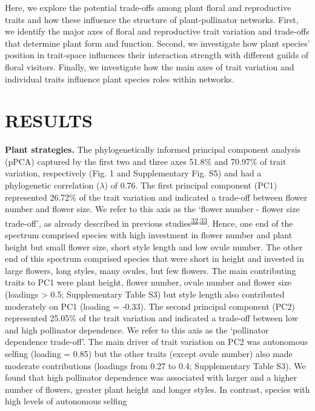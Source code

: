 \documentclass[12pt,a4paper,]{article}
\begin{document}
Here, we explore the potential trade-offs among plant floral and
reproductive traits and how these influence the structure of
plant-pollinator networks. First, we identify the major axes of floral
and reproductive trait variation and trade-offs that determine plant
form and function. Second, we investigate how plant species' position in
trait-space influences their interaction strength with different guilds
of floral visitors. Finally, we investigate how the main axes of trait
variation and individual traits influence plant species roles within
networks.

\section{RESULTS}\label{results}

\textbf{Plant strategies.} The phylogenetically informed principal
component analysis (pPCA) captured by the first two and three axes
51.8\% and 70.97\% of trait variation, respectively (Fig. 1 and
Supplementary Fig. S5) and had a phylogenetic correlation (\(\lambda\))
of 0.76. The first principal component (PC1) represented 26.72\% of the
trait variation and indicated a trade-off between flower number and
flower size. We refer to this axis as the `flower number - flower size
trade-off', as already described in previous
studies\textsuperscript{\protect\hyperlink{ref-sargent2007}{32},\protect\hyperlink{ref-kettle2011}{33}}.
Hence, one end of the spectrum comprised species with high investment in
flower number and plant height but small flower size, short style length
and low ovule number. The other end of this spectrum comprised species
that were short in height and invested in large flowers, long styles,
many ovules, but few flowers. The main contributing traits to PC1 were
plant height, flower number, ovule number and flower size (loadings
\textgreater{} \textbar{}0.5\textbar{}; Supplementary Table S3) but
style length also contributed moderately on PC1 (loading = -0.33). The
second principal component (PC2) represented 25.05\% of the trait
variation and indicated a trade-off between low and high pollinator
dependence. We refer to this axis as the `pollinator dependence
trade-off'. The main driver of trait variation on PC2 was autonomous
selfing (loading = 0.85) but the other traits (except ovule number) also
made moderate contributions (loadings from 0.27 to 0.4; Supplementary
Table S3). We found that high pollinator dependence was associated with
larger and a higher number of flowers, greater plant height and longer
styles. In contrast, species with high levels of autonomous selfing
\end{document}
